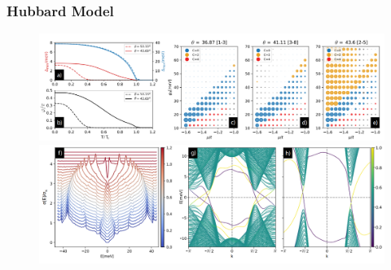 \documentclass{beamer}
\begin{document}
\begin{frame}
\frametitle{Hubbard Model}
\begin{figure}
\centering
\includegraphics[scale=0.5]{pic/p9.png}
\includegraphics[scale=0.5]{pic/p10.png}
\end{figure}
\end{frame}
\end{document}
